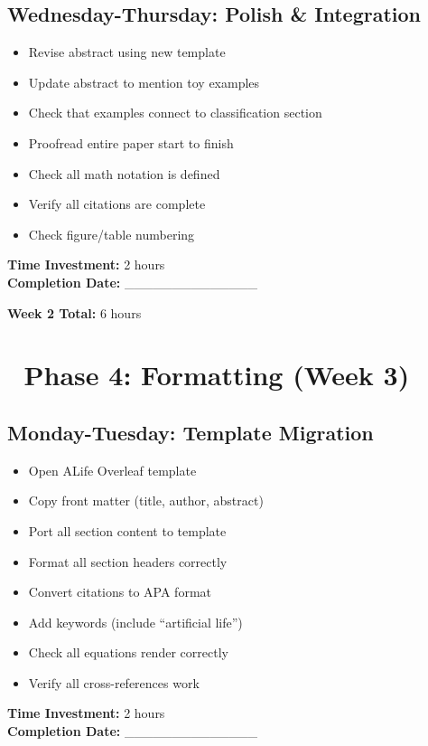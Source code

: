 \documentclass[11pt]{article}
\begin{document}
\subsection*{Wednesday-Thursday: Polish \& Integration}
\begin{itemize}[label=$\square$]
    \item Revise abstract using new template
    \item Update abstract to mention toy examples
    \item Check that examples connect to classification section
    \item Proofread entire paper start to finish
    \item Check all math notation is defined
    \item Verify all citations are complete
    \item Check figure/table numbering
\end{itemize}

\textbf{Time Investment:} 2 hours\\
\textbf{Completion Date:} \_\_\_\_\_\_\_\_\_\_\_\_\_\_

\textbf{Week 2 Total:} 6 hours

\section*{📝 Phase 4: Formatting (Week 3)}

\subsection*{Monday-Tuesday: Template Migration}
\begin{itemize}[label=$\square$]
    \item Open ALife Overleaf template
    \item Copy front matter (title, author, abstract)
    \item Port all section content to template
    \item Format all section headers correctly
    \item Convert citations to APA format
    \item Add keywords (include ``artificial life'')
    \item Check all equations render correctly
    \item Verify all cross-references work
\end{itemize}

\textbf{Time Investment:} 2 hours\\
\textbf{Completion Date:} \_\_\_\_\_\_\_\_\_\_\_\_\_\_
\end{document}

